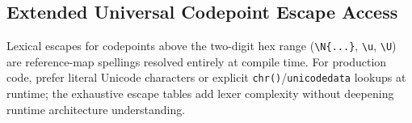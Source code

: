 \subsection{Extended Universal Codepoint Escape Access}

Lexical escapes for codepoints above the two-digit hex range (\texttt{\textbackslash N\{...\}}, \texttt{\textbackslash u}, \texttt{\textbackslash U}) are reference-map spellings resolved entirely at compile time. For production code, prefer literal Unicode characters or explicit \texttt{chr()}/\texttt{unicodedata} lookups at runtime; the exhaustive escape tables add lexer complexity without deepening runtime architecture understanding.
